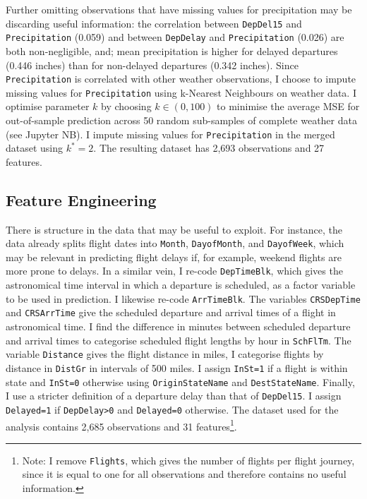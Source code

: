 \documentclass[
]{article}
\begin{document}
Further omitting observations that have missing values for precipitation
may be discarding useful information: the correlation between
\texttt{DepDel15} and \texttt{Precipitation} (0.059) and between
\texttt{DepDelay} and \texttt{Precipitation} (0.026) are both
non-negligible, and; mean precipitation is higher for delayed departures
(0.446 inches) than for non-delayed departures (0.342 inches). Since
\texttt{Precipitation} is correlated with other weather observations, I
choose to impute missing values for \texttt{Precipitation} using
k-Nearest Neighbours on weather data. I optimise parameter \(k\) by
choosing \(k \in (0,100)\) to minimise the average MSE for out-of-sample
prediction across 50 random sub-samples of complete weather data (see
Jupyter NB). I impute missing values for \texttt{Precipitation} in the
merged dataset using \(k^*=2\). The resulting dataset has 2,693
observations and 27 features.\\

\subsection{Feature Engineering}

There is structure in the data that may be useful to exploit. For
instance, the data already splits flight dates into \texttt{Month},
\texttt{DayofMonth}, and \texttt{DayofWeek}, which may be relevant in
predicting flight delays if, for example, weekend flights are more prone
to delays. In a similar vein, I re-code \texttt{DepTimeBlk}, which gives
the astronomical time interval in which a departure is scheduled, as a
factor variable to be used in prediction. I likewise re-code
\texttt{ArrTimeBlk}. The variables \texttt{CRSDepTime} and
\texttt{CRSArrTime} give the scheduled departure and arrival times of a
flight in astronomical time. I find the difference in minutes between
scheduled departure and arrival times to categorise scheduled flight
lengths by hour in \texttt{SchFlTm}. The variable \texttt{Distance}
gives the flight distance in miles, I categorise flights by distance in
\texttt{DistGr} in intervals of 500 miles. I assign \texttt{InSt=1} if a
flight is within state and \texttt{InSt=0} otherwise using
\texttt{OriginStateName} and \texttt{DestStateName}. Finally, I use a
stricter definition of a departure delay than that of \texttt{DepDel15}.
I assign \texttt{Delayed=1} if \texttt{DepDelay>0} and
\texttt{Delayed=0} otherwise. The dataset used for the analysis contains
2,685 observations and 31
features\footnote{Note: I remove \texttt{Flights}, which gives the number of flights per flight journey, since it is equal to one for all observations and therefore contains no useful information.}.
\end{document}
